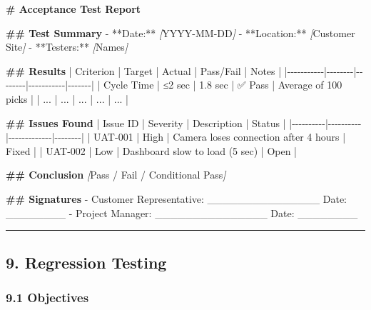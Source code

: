 \documentclass[
]{article}
\newenvironment{Shaded}{\begin{snugshade}}{\end{snugshade}}
\newcommand{\CommentTok}[1]{\textcolor[rgb]{0.56,0.35,0.01}{\textit{#1}}}
\newcommand{\FunctionTok}[1]{\textcolor[rgb]{0.13,0.29,0.53}{\textbf{#1}}}
\newcommand{\NormalTok}[1]{#1}
\newcommand{\OtherTok}[1]{\textcolor[rgb]{0.56,0.35,0.01}{#1}}
\newcommand{\SpecialStringTok}[1]{\textcolor[rgb]{0.31,0.60,0.02}{#1}}
\begin{document}
\begin{Shaded}
\begin{Highlighting}[]
\FunctionTok{\# Acceptance Test Report}

\FunctionTok{\#\# Test Summary}
\SpecialStringTok{{-} }\NormalTok{**Date:** }\CommentTok{[}\OtherTok{YYYY{-}MM{-}DD}\CommentTok{]}
\SpecialStringTok{{-} }\NormalTok{**Location:** }\CommentTok{[}\OtherTok{Customer Site}\CommentTok{]}
\SpecialStringTok{{-} }\NormalTok{**Testers:** }\CommentTok{[}\OtherTok{Names}\CommentTok{]}

\FunctionTok{\#\# Results}
\NormalTok{| Criterion | Target | Actual | Pass/Fail | Notes |}
\NormalTok{|{-}{-}{-}{-}{-}{-}{-}{-}{-}{-}{-}|{-}{-}{-}{-}{-}{-}{-}{-}|{-}{-}{-}{-}{-}{-}{-}{-}|{-}{-}{-}{-}{-}{-}{-}{-}{-}{-}{-}|{-}{-}{-}{-}{-}{-}{-}|}
\NormalTok{| Cycle Time | ≤2 sec | 1.8 sec | ✅ Pass | Average of 100 picks |}
\NormalTok{| ... | ... | ... | ... | ... |}

\FunctionTok{\#\# Issues Found}
\NormalTok{| Issue ID | Severity | Description | Status |}
\NormalTok{|{-}{-}{-}{-}{-}{-}{-}{-}{-}{-}|{-}{-}{-}{-}{-}{-}{-}{-}{-}{-}|{-}{-}{-}{-}{-}{-}{-}{-}{-}{-}{-}{-}{-}|{-}{-}{-}{-}{-}{-}{-}{-}|}
\NormalTok{| UAT{-}001 | High | Camera loses connection after 4 hours | Fixed |}
\NormalTok{| UAT{-}002 | Low | Dashboard slow to load (5 sec) | Open |}

\FunctionTok{\#\# Conclusion}
\CommentTok{[}\OtherTok{Pass / Fail / Conditional Pass}\CommentTok{]}

\FunctionTok{\#\# Signatures}
\SpecialStringTok{{-} }\NormalTok{Customer Representative: \_\_\_\_\_\_\_\_\_\_\_\_\_\_\_ Date: \_\_\_\_\_\_\_\_}
\SpecialStringTok{{-} }\NormalTok{Project Manager: \_\_\_\_\_\_\_\_\_\_\_\_\_\_\_ Date: \_\_\_\_\_\_\_\_}
\end{Highlighting}
\end{Shaded}

\begin{center}\rule{0.5\linewidth}{0.5pt}\end{center}

\hypertarget{regression-testing}{%
\subsection{9. Regression Testing}\label{regression-testing}}

\hypertarget{objectives-6}{%
\subsubsection{9.1 Objectives}\label{objectives-6}}
\end{document}
